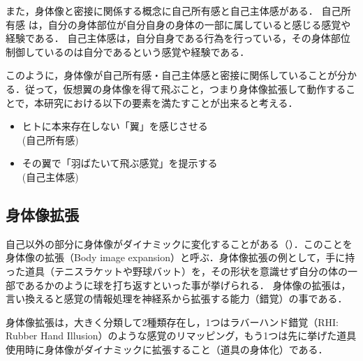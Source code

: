 \begin{small}

    また，身体像と密接に関係する概念に自己所有感と自己主体感がある．
    自己所有感 は，自分の身体部位が自分自身の身体の一部に属していると感じる感覚や経験である．
    自己主体感は，自分自身である行為を行っている，その身体部位制御しているのは自分であるという感覚や経験である．

    このように，身体像が自己所有感・自己主体感と密接に関係していることが分かる．従って，仮想翼の身体像を得て飛ぶこと，つまり身体像拡張して動作することで，本研究における以下の要素を満たすことが出来ると考える．

    \begin{itemize}
        \item ヒトに本来存在しない「翼」を感じさせる\\(自己所有感)
        \item その翼で「羽ばたいて飛ぶ感覚」を提示する\\(自己主体感)
    \end{itemize}

  \subsection{身体像拡張}

    自己以外の部分に身体像がダイナミックに変化することがある（）．このことを身体像の拡張（Body image expansion）と呼ぶ．身体像拡張の例として，手に持った道具（テニスラケットや野球バット）を，その形状を意識せず自分の体の一部であるかのように球を打ち返すといった事が挙げられる．
    身体像の拡張は，言い換えると感覚の情報処理を神経系から拡張する能力（錯覚）の事である．

    身体像拡張は，大きく分類して2種類存在し，1つはラバーハンド錯覚（RHI: Rubber Hand Illusion）\cite{botvinick1998rubber}のような感覚のリマッピング，もう1つは先に挙げた道具使用時に身体像がダイナミックに拡張すること（道具の身体化）である．


\end{small}

